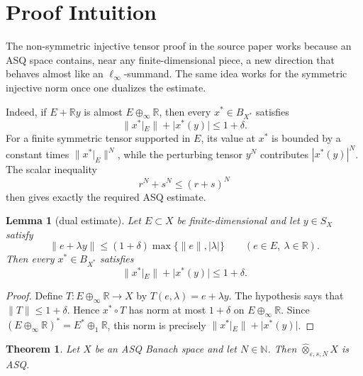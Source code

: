 \documentclass[11pt]{article}
\newtheorem{theorem}{Theorem}
\newtheorem{lemma}{Lemma}
\newcommand{\Ball}{B}
\newcommand{\Sphere}{S}
\newcommand{\R}{\mathbb R}
\newcommand{\N}{\mathbb N}
\begin{document}
\section*{Proof Intuition}

The non-symmetric injective tensor proof in the source paper works because
an ASQ space contains, near any finite-dimensional piece, a new direction that
behaves almost like an \(\ell_\infty\)-summand. The same idea works for the
symmetric injective norm once one dualizes the estimate.

Indeed, if \(E+\R y\) is almost \(E\oplus_\infty \R\), then every
\(x^*\in \Ball_{X^*}\) satisfies
\[
  \|x^*|_E\|+|x^*(y)|\le 1+\delta.
\]
For a finite symmetric tensor supported in \(E\), its value at \(x^*\) is
bounded by a constant times \(\|x^*|_E\|^N\), while the perturbing tensor
\(y^N\) contributes \(|x^*(y)|^N\). The scalar inequality
\[
  r^N+s^N\le (r+s)^N
\]
then gives exactly the required ASQ estimate.

\begin{lemma}[dual estimate]\label{lem:dual}
Let \(E\subset X\) be finite-dimensional and let \(y\in \Sphere_X\) satisfy
\[
  \|e+\lambda y\|\le (1+\delta)\max\{\|e\|,|\lambda|\}
  \qquad(e\in E,\ \lambda\in\R).
\]
Then every \(x^*\in \Ball_{X^*}\) satisfies
\[
  \|x^*|_E\|+|x^*(y)|\le 1+\delta .
\]
\end{lemma}

\begin{proof}
Define \(T:E\oplus_\infty \R\to X\) by \(T(e,\lambda)=e+\lambda y\).
The hypothesis says that \(\|T\|\le 1+\delta\). Hence
\(x^*\circ T\) has norm at most \(1+\delta\) on \(E\oplus_\infty \R\).
Since \((E\oplus_\infty\R)^*=E^*\oplus_1\R\), this norm is precisely
\(\|x^*|_E\|+|x^*(y)|\).
\end{proof}

\begin{theorem}
Let \(X\) be an ASQ Banach space and let \(N\in\N\). Then
\(\widehat{\otimes}_{\varepsilon,s,N}X\) is ASQ.
\end{theorem}
\end{document}
